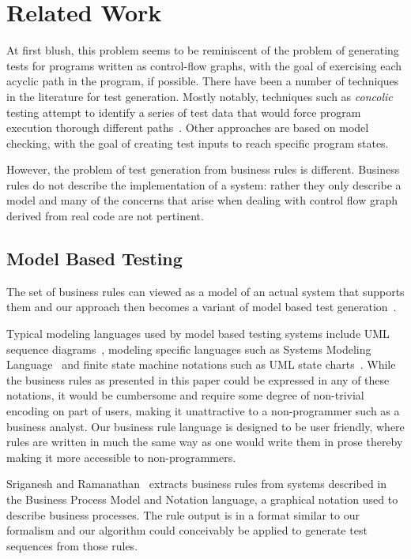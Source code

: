 \section{Related Work}
\label{sec:related}

At first blush, this problem seems to be reminiscent of the problem of
generating tests for programs written as control-flow graphs, with the
goal of exercising each acyclic path in the program, if possible.
There have been a number of techniques in the literature for test
generation. Mostly notably, techniques such as \textit{concolic}
testing attempt to identify a series of test data that would force
program execution thorough different paths~\cite{dart, concolic}.  Other
approaches are based on model checking, with the goal of creating test
inputs to reach specific program states.

However, the problem of test generation from business rules is
different. Business rules do not describe the implementation of a
system: rather they only describe a model and many of the concerns
that arise when dealing with control flow graph derived from real code
are not pertinent.

\subsection{Model Based Testing}

The set of business rules can viewed as a model of an actual system
that supports them and our approach then becomes a variant of model
based test generation~\cite{utting2012}.

Typical modeling languages used by model based testing systems include
UML sequence diagrams~\cite{nayak2009}, modeling specific languages
such as Systems Modeling Language~\cite{friedenthal2011} and
finite state machine notations such as UML state
charts~\cite{offhut99}. While the business rules as presented in this
paper could be expressed in any of these notations, it would be
cumbersome and require some degree of non-trivial encoding on part of
users, making it unattractive to a non-programmer such as a business analyst. Our business
rule language is designed to be user friendly, where rules are written 
in much the same way as one would write them in prose thereby making it more accessible
to non-programmers.

Sriganesh and Ramanathan~\cite{sriganesh2012} extracts business rules
from systems described in the Business Process Model and Notation
language, a graphical notation used to describe business
processes. The rule output is in a format similar to our formalism and
our algorithm could conceivably be applied to generate test sequences
from those rules.

